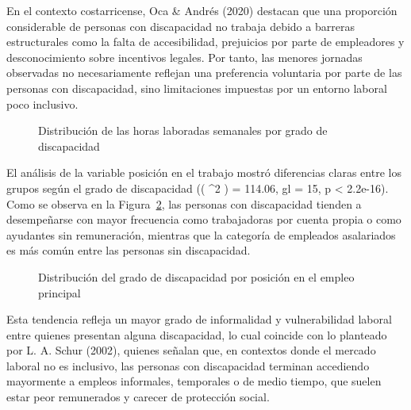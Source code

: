 \documentclass[
  11pt,
  oneside]{article}
\begin{document}
En el contexto costarricense, Oca \& Andrés (2020) destacan que una
proporción considerable de personas con discapacidad no trabaja debido a
barreras estructurales como la falta de accesibilidad, prejuicios por
parte de empleadores y desconocimiento sobre incentivos legales. Por
tanto, las menores jornadas observadas no necesariamente reflejan una
preferencia voluntaria por parte de las personas con discapacidad, sino
limitaciones impuestas por un entorno laboral poco inclusivo.

\begin{figure}


\caption{\label{fig-horas}Distribución de las horas laboradas semanales
por grado de discapacidad}

\end{figure}%

El análisis de la variable posición en el trabajo mostró diferencias
claras entre los grupos según el grado de discapacidad (( \chi\^{}2 ) =
114.06, gl = 15, p \textless{} 2.2e-16). Como se observa en la
Figura~\ref{fig-posicion}, las personas con discapacidad tienden a
desempeñarse con mayor frecuencia como trabajadoras por cuenta propia o
como ayudantes sin remuneración, mientras que la categoría de empleados
asalariados es más común entre las personas sin discapacidad.

\begin{figure}


\caption{\label{fig-posicion}Distribución del grado de discapacidad por
posición en el empleo principal}

\end{figure}%

Esta tendencia refleja un mayor grado de informalidad y vulnerabilidad
laboral entre quienes presentan alguna discapacidad, lo cual coincide
con lo planteado por L. A. Schur (2002), quienes señalan que, en
contextos donde el mercado laboral no es inclusivo, las personas con
discapacidad terminan accediendo mayormente a empleos informales,
temporales o de medio tiempo, que suelen estar peor remunerados y
carecer de protección social.
\end{document}
